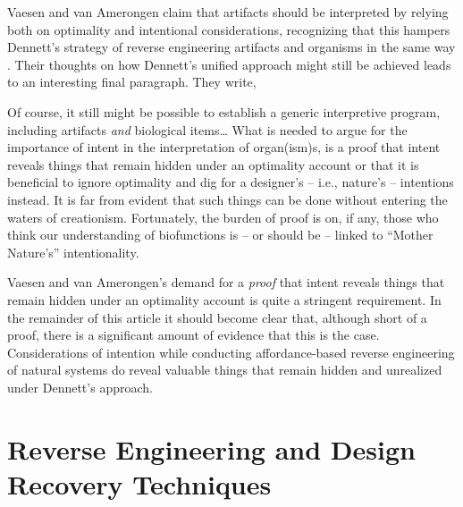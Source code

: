 Vaesen and van Amerongen claim that artifacts should be interpreted by
relying both on optimality and intentional considerations, recognizing
that this hampers Dennett’s strategy of reverse engineering artifacts
and organisms in the same way \citep[][pp. 794--795]{vaesenamerongen2008}. Their thoughts on
how Dennett’s unified approach might still be achieved leads to an
interesting final paragraph. They write,

\begin{quoting}
Of course, it still might be
possible to establish a generic interpretive program, including
artifacts \textit{and} biological items… What is needed to argue for
the importance of intent in the interpretation of organ(ism)s, is a
proof that intent reveals things that remain hidden under an optimality
account or that it is beneficial to ignore optimality and dig for a
designer’s – i.e., nature’s – intentions instead. It is far from
evident that such things can be done without entering the waters of
creationism. Fortunately, the burden of proof is on, if any, those who
think our understanding of biofunctions is – or should be – linked to
“Mother Nature’s” intentionality.  \citep[][p.~795]{vaesenamerongen2008}
\end{quoting}

Vaesen and van
Amerongen’s demand for a \textit{proof} that intent reveals things that
remain hidden under an optimality account is quite a stringent
requirement. In the remainder of this article it should become clear
that, although short of a proof, there is a significant amount of
evidence that this is the case. Considerations of intention while
conducting affordance-based reverse engineering of natural systems do
reveal valuable things that remain hidden and unrealized under
Dennett’s approach.

\section{Reverse Engineering and Design Recovery Techniques}

